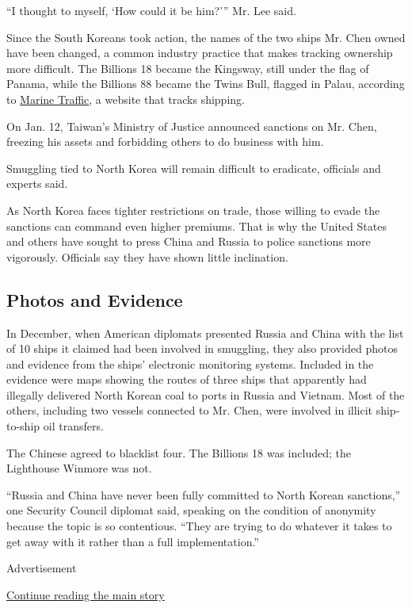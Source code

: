 ``I thought to myself, `How could it be him?''' Mr. Lee said.

Since the South Koreans took action, the names of the two ships Mr. Chen
owned have been changed, a common industry practice that makes tracking
ownership more difficult. The Billions 18 became the Kingsway, still
under the flag of Panama, while the Billions 88 became the Twins Bull,
flagged in Palau, according to
\href{https://www.marinetraffic.com/}{Marine Traffic}, a website that
tracks shipping.

On Jan. 12, Taiwan's Ministry of Justice announced sanctions on Mr.
Chen, freezing his assets and forbidding others to do business with him.

Smuggling tied to North Korea will remain difficult to eradicate,
officials and experts said.

As North Korea faces tighter restrictions on trade, those willing to
evade the sanctions can command even higher premiums. That is why the
United States and others have sought to press China and Russia to police
sanctions more vigorously. Officials say they have shown little
inclination.

\hypertarget{photos-and-evidence}{%
\subsection{Photos and Evidence}\label{photos-and-evidence}}

In December, when American diplomats presented Russia and China with the
list of 10 ships it claimed had been involved in smuggling, they also
provided photos and evidence from the ships' electronic monitoring
systems. Included in the evidence were maps showing the routes of three
ships that apparently had illegally delivered North Korean coal to ports
in Russia and Vietnam. Most of the others, including two vessels
connected to Mr. Chen, were involved in illicit ship-to-ship oil
transfers.

The Chinese agreed to blacklist four. The Billions 18 was included; the
Lighthouse Winmore was not.

``Russia and China have never been fully committed to North Korean
sanctions,'' one Security Council diplomat said, speaking on the
condition of anonymity because the topic is so contentious. ``They are
trying to do whatever it takes to get away with it rather than a full
implementation.''

Advertisement

\protect\hyperlink{after-bottom}{Continue reading the main story}

